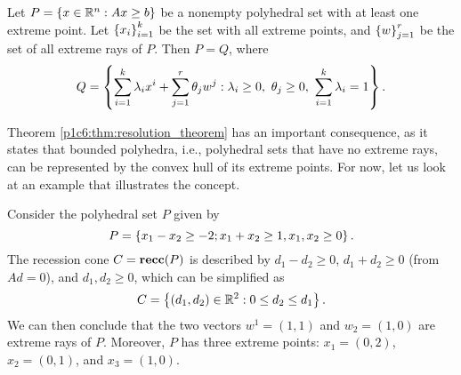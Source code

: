 \begin{theorem}\label{p1c6:thm:resolution_theorem}
	Let $P = \left\{ x \in \mathbb{R}^n : Ax \geq b \right \}$ be a nonempty polyhedral set with at least one extreme point. Let $\left\{ x_i \right \}_{i=1}^k$ be the set with all extreme points, and $\left\{ w \right \}_{j=1}^r$ be the set of all extreme rays of $P$. Then $P = Q$, where 
	\begin{equation*}
		Q = \braces{\sum_{i=1}^k \lambda_i x^i + \sum_{j=1}^r \theta_jw^j : \lambda_i \geq 0, \ \theta_j \geq 0, \ \sum_{i=1}^k \lambda_i =1}.
	\end{equation*}
\end{theorem}


Theorem \ref{p1c6:thm:resolution_theorem} has an important consequence, as it states that bounded polyhedra, i.e., polyhedral sets that have no extreme rays, can be represented by the convex hull of its extreme points. For now, let us look at an example that illustrates the concept.

Consider the polyhedral set $P$ given by
%
\begin{equation*}
	P = \left\{ x_1 - x_2 \geq -2; x_1 + x_2 \geq 1, x_1,x_2 \geq 0 \right \}.
\end{equation*}
%
The recession cone $C = {\bf recc}(P)$ is described by $d_1 - d_2 \geq 0$, $d_1 + d_2 \geq 0$ (from $Ad =0$), and $d_1, d_2 \geq 0$, which can be simplified as 
%
\begin{equation*}
	C = \left\{ (d_1, d_2) \in \mathbb{R}^2 : 0 \leq d_2 \leq d_1 \right \}.
\end{equation*}
%
We can then conclude that the two vectors $w^1 = (1,1)$ and $w_2 = (1,0)$ are extreme rays of $P$. Moreover, $P$ has three extreme points: $x_1 = (0,2)$, $x_2 = (0,1)$, and $x_3 = (1,0)$.

